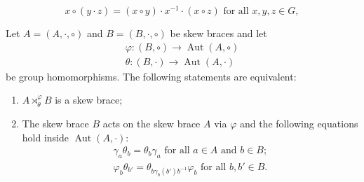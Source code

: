 \documentclass[10pt,a4paper]{amsart}
\DeclareMathOperator{\Aut}{\mbox{Aut}}
\begin{document}
\begin{equation} \label{eqn_skew_brace}
x \circ (y \cdot z) = (x \circ y) \cdot x^{-1} \cdot (x \circ z) \mbox{ for all } x,y,z \in G, 
\end{equation}

\begin{theorem} \label{thm_external_semidirect}
Let $ A=(A,\cdot,\circ) $ and $ B=(B,\cdot,\circ) $ be skew braces and let
\begin{eqnarray*}
\varphi : (B,\circ) \rightarrow \Aut(A,\circ) \\
\theta : (B,\cdot) \rightarrow \Aut(A,\cdot)
\end{eqnarray*}
be group homomorphisms. The following statements are equivalent:
\begin{enumerate}
\item \label{enum_external_sdp_1} $ A \rtimes_{\theta}^{\varphi} B $ is a skew brace;
\item \label{enum_external_sdp_2} The skew brace $ B $ acts on the skew brace $ A $ via $ \varphi $ and the following equations hold inside $ \Aut(A,\cdot) $: 
\begin{eqnarray}
\gamma_{a} \theta_{b} = \theta_{b} \gamma_{a} \mbox{ for all } a \in A \mbox{ and } b \in B; \label{eqn_external_sdp_1} \\
\varphi_{b} \theta_{b'} = \theta_{b \gamma_{b}(b') b^{-1}} \varphi_{b} \mbox{ for all } b, b' \in B. \label{eqn_external_sdp_2}
\end{eqnarray}
\end{enumerate}
\end{theorem}
\end{document}
